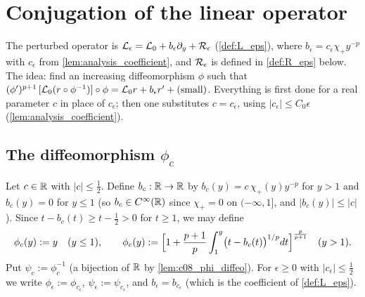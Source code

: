 \section{Conjugation of the linear operator}

The perturbed operator is $\mathcal{L}_\epsilon=\mathcal{L}_0+b_\epsilon\partial_y+\mathcal{R}_\epsilon$ (\cref{def:L_eps}), where
$b_\epsilon=c_\epsilon\chi_+y^{-p}$ with $c_\epsilon$ from \cref{lem:analysis_coefficient}, and $\mathcal{R}_\epsilon$ is defined
in \cref{def:R_eps} below. The idea: find an increasing diffeomorphism $\phi$ such that
$(\phi')^{p+1}\,[\mathcal{L}_0(r\circ\phi^{-1})]\circ\phi=\mathcal{L}_0r+b_\epsilon r'+(\text{small})$. Everything is first done for a
real parameter $c$ in place of $c_\epsilon$; then one substitutes $c=c_\epsilon$, using $|c_\epsilon|\le C_0\epsilon$
(\cref{lem:analysis_coefficient}).

\subsection{The diffeomorphism $\phi_c$}

\begin{definition}
  \label{def:c08_phi}
  Let $c\in\mathbb{R}$ with $|c|\le\frac12$. Define $b_c:\mathbb{R}\to\mathbb{R}$ by $b_c(y)=c\,\chi_+(y)y^{-p}$ for $y>1$ and
  $b_c(y)=0$ for $y\le1$ (so $b_c\in C^\infty(\mathbb{R})$ since $\chi_+=0$ on $(-\infty,1]$, and
  $|b_c(y)|\le|c|$). Since $t-b_c(t)\ge t-\frac12>0$ for $t\ge1$, we may define
  \[
    \phi_c(y):=y\quad(y\le1),\qquad
    \phi_c(y):=\Bigl[1+\frac{p+1}{p}\int_1^y\bigl(t-b_c(t)\bigr)^{1/p}dt\Bigr]^{\frac p{p+1}}\quad(y>1).
  \]
  Put $\psi_c:=\phi_c^{-1}$ (a bijection of $\mathbb{R}$ by \cref{lem:c08_phi_diffeo}). For $\epsilon\ge0$ with
  $|c_\epsilon|\le\frac12$ we write $\phi_\epsilon:=\phi_{c_\epsilon}$, $\psi_\epsilon:=\psi_{c_\epsilon}$, and $b_\epsilon=b_{c_\epsilon}$ (which
  is the coefficient of \cref{def:L_eps}).
\end{definition}

